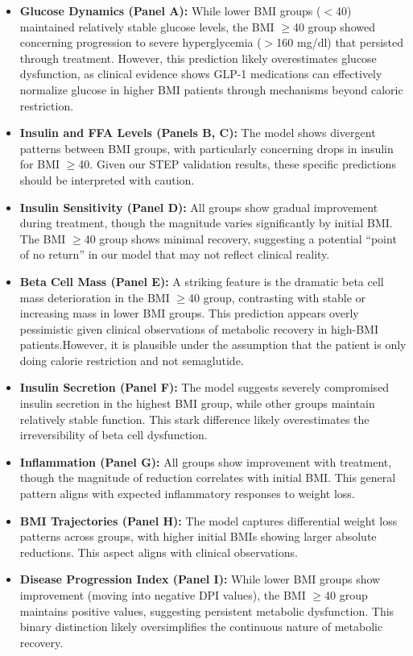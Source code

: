 \begin{itemize}
    \item \textbf{Glucose Dynamics (Panel A):} While lower BMI groups ($<$40) maintained relatively stable glucose levels, the BMI $\geq$40 group showed concerning progression to severe hyperglycemia ($>$160 mg/dl) that persisted through treatment. However, this prediction likely overestimates glucose dysfunction, as clinical evidence shows GLP-1 medications can effectively normalize glucose in higher BMI patients through mechanisms beyond caloric restriction.
    
    \item \textbf{Insulin and FFA Levels (Panels B, C):} The model shows divergent patterns between BMI groups, with particularly concerning drops in insulin for BMI $\geq$40. Given our STEP validation results, these specific predictions should be interpreted with caution.
    
    \item \textbf{Insulin Sensitivity (Panel D):} All groups show gradual improvement during treatment, though the magnitude varies significantly by initial BMI. The BMI $\geq$40 group shows minimal recovery, suggesting a potential ``point of no return'' in our model that may not reflect clinical reality.
    
    \item \textbf{Beta Cell Mass (Panel E):} A striking feature is the dramatic beta cell mass deterioration in the BMI $\geq$40 group, contrasting with stable or increasing mass in lower BMI groups. This prediction appears overly pessimistic given clinical observations of metabolic recovery in high-BMI patients.However, it is plausible under the assumption that the patient is only doing calorie restriction and not semaglutide.
    
    \item \textbf{Insulin Secretion (Panel F):} The model suggests severely compromised insulin secretion in the highest BMI group, while other groups maintain relatively stable function. This stark difference likely overestimates the irreversibility of beta cell dysfunction.
    
    \item \textbf{Inflammation (Panel G):} All groups show improvement with treatment, though the magnitude of reduction correlates with initial BMI. This general pattern aligns with expected inflammatory responses to weight loss.
    
    \item \textbf{BMI Trajectories (Panel H):} The model captures differential weight loss patterns across groups, with higher initial BMIs showing larger absolute reductions. This aspect aligns with clinical observations.
    
    \item \textbf{Disease Progression Index (Panel I):} While lower BMI groups show improvement (moving into negative DPI values), the BMI $\geq$40 group maintains positive values, suggesting persistent metabolic dysfunction. This binary distinction likely oversimplifies the continuous nature of metabolic recovery.
\end{itemize}

